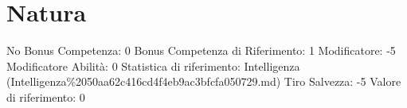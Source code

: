 \section{Natura}\label{natura}

\begin{description}
\tightlist
\item[Tags: ABI]
No Bonus Competenza: 0 Bonus Competenza di Riferimento: 1 Modificatore:
-5 Modificatore Abilità: 0 Statistica di riferimento: Intelligenza
(Intelligenza\%2050aa62c416cd4f4eb9ac3bfcfa050729.md) Tiro Salvezza: -5
Valore di riferimento: 0
\end{description}
